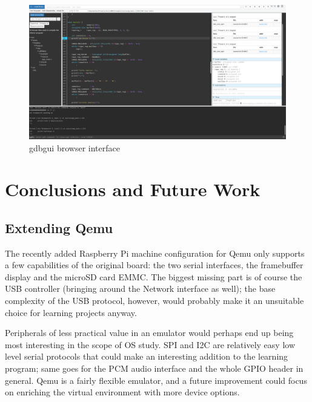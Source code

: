 \documentclass[12pt,a4paper,openright,twoside]{report}
\begin{document}
 \begin{figure}[t]
 \includegraphics[scale=0.34,angle=-90,origin=c]{images/tesi4.png}
 \caption[Gdbgui]{gdbgui browser interface}\label{fig:gdbgui}
 \end{figure}





\clearpage{\pagestyle{empty}\cleardoublepage}
\chapter{Conclusions and Future Work}
\section{Extending Qemu}
The recently added Raspberry Pi machine configuration for Qemu only supports a few
capabilities of the original board: the two serial interfaces, the framebuffer
display and the microSD card EMMC.
The biggest missing part is of course the USB controller (bringing around the
Network interface as well); the base complexity of the USB protocol, however,
 would probably make it an unsuitable choice for learning projects anyway.

Peripherals of less practical value in an emulator would perhaps end up being
most interesting in the scope of OS study. SPI and I2C are relatively
easy low level serial protocols that could make an interesting addition to the
learning program; same goes for the PCM audio interface and the whole GPIO 
header in general.
Qemu is a fairly flexible emulator, and a future improvement could focus on 
enriching the virtual environment with more device options.
\end{document}
